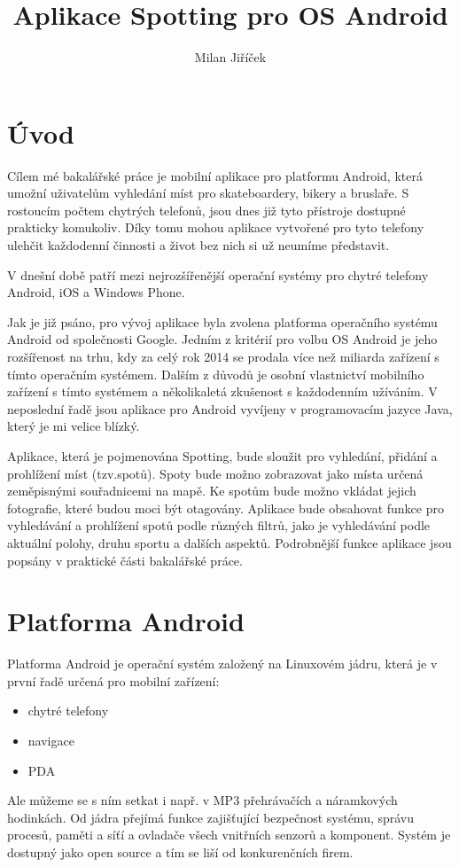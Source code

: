 \documentclass[12pt]{article}
\title{Aplikace Spotting pro OS Android}
\author{Milan Jiříček}
\begin{document}
\maketitle

\newpage

\section{Úvod}
Cílem mé bakalářské práce je mobilní aplikace pro platformu Android, která umožní uživatelům vyhledání míst pro skateboardery, bikery a bruslaře. S rostoucím počtem chytrých telefonů, jsou dnes již tyto přístroje dostupné prakticky komukoliv. Díky tomu mohou aplikace vytvořené pro tyto telefony ulehčit každodenní činnosti a život bez nich si už neumíme představit.

V dnešní době patří mezi nejrozšířenější operační systémy pro chytré telefony Android, iOS a Windows Phone.

Jak je již psáno, pro vývoj aplikace byla zvolena platforma operačního systému Android od společnosti Google. Jedním z kritérií pro volbu OS Android je jeho rozšířenost na trhu, kdy za celý rok 2014 se prodala více než miliarda zařízení s tímto operačním systémem. Dalším z důvodů je osobní vlastnictví mobilního zařízení s tímto systémem a několikaletá zkušenost s každodenním užíváním. V neposlední řadě jsou aplikace pro Android vyvíjeny v programovacím jazyce Java, který je mi velice blízký.

Aplikace, která je pojmenována Spotting, bude sloužit pro vyhledání, přidání a prohlížení míst (tzv.spotů). Spoty bude možno zobrazovat jako místa určená zeměpisnými souřadnicemi na mapě. Ke spotům bude možno vkládat jejich fotografie, které budou moci být otagovány. Aplikace bude obsahovat funkce pro vyhledávání a prohlížení spotů  podle různých filtrů, jako je vyhledávání podle aktuální polohy, druhu sportu a dalších aspektů. Podrobnější funkce aplikace jsou popsány v praktické části bakalářské práce.
\newpage

\section{Platforma Android}
Platforma Android je operační systém založený na Linuxovém jádru, která je v první řadě určená pro mobilní zařízení:
\begin{itemize}
\item chytré telefony
\item navigace
\item PDA
\end{itemize}
Ale můžeme se s ním setkat i např. v MP3 přehrávačích a náramkových hodinkách.
Od jádra přejímá funkce zajišťující bezpečnost systému, správu procesů, paměti a síťí a ovladače všech vnitřních senzorů a komponent. Systém je dostupný jako open source a tím se  liší od konkurenčních firem.
\end{document}
